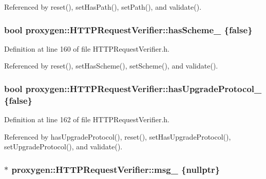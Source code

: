 Referenced by reset(), set\+Has\+Path(), set\+Path(), and validate().

\subsubsection[{has\+Scheme\+\_\+}]{\setlength{\rightskip}{0pt plus 5cm}bool proxygen\+::\+H\+T\+T\+P\+Request\+Verifier\+::has\+Scheme\+\_\+ \{false\}\hspace{0.3cm}{\ttfamily [private]}}\label{classproxygen_1_1HTTPRequestVerifier_aab566322873864c9affe8deea9741188}


Definition at line 160 of file H\+T\+T\+P\+Request\+Verifier.\+h.



Referenced by reset(), set\+Has\+Scheme(), set\+Scheme(), and validate().

\subsubsection[{has\+Upgrade\+Protocol\+\_\+}]{\setlength{\rightskip}{0pt plus 5cm}bool proxygen\+::\+H\+T\+T\+P\+Request\+Verifier\+::has\+Upgrade\+Protocol\+\_\+ \{false\}\hspace{0.3cm}{\ttfamily [private]}}\label{classproxygen_1_1HTTPRequestVerifier_a4f9a07b5661010f94425c3d72ecec48f}


Definition at line 162 of file H\+T\+T\+P\+Request\+Verifier.\+h.



Referenced by has\+Upgrade\+Protocol(), reset(), set\+Has\+Upgrade\+Protocol(), set\+Upgrade\+Protocol(), and validate().

\subsubsection[{msg\+\_\+}]{$\ast$ proxygen\+::\+H\+T\+T\+P\+Request\+Verifier\+::msg\+\_\+ \{{\bf nullptr}\}\hspace{0.3cm}{\ttfamily [private]}}\label{classproxygen_1_1HTTPRequestVerifier_afa4759839543503b5abc455c55457a28}


